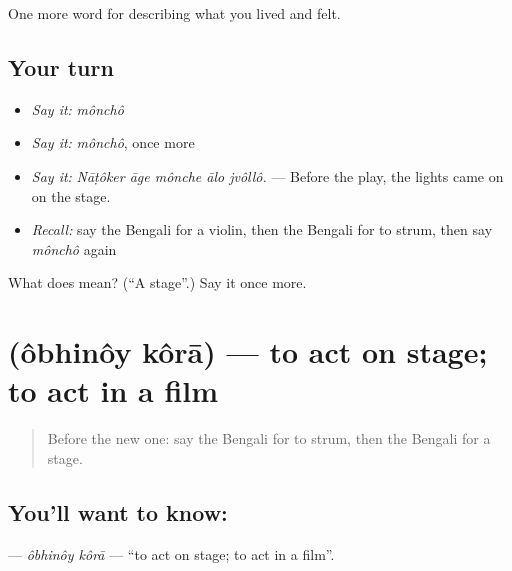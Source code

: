 \begin{grammarlens}[title={What you've built}]
One more word for describing what you lived and felt.
\end{grammarlens}

\subsection*{Your turn}
\begin{itemize}
\raggedright
  \item \emph{Say it:} \emph{mônchô}
  \item \emph{Say it:} \emph{mônchô}, once more
  \item \emph{Say it:} \emph{Nāṭôker āge mônche ālo jvôllô.} — Before the play, the lights came on on the stage.
  \item \emph{Recall:} say the Bengali for a violin, then the Bengali for to strum, then say \emph{mônchô} again
\end{itemize}

\begin{tcolorbox}[breakable,colback=teal!4,colframe=teal!35!black,title={Before you move on}]
What does  mean? (\textquotedblleft{}A stage\textquotedblright{}.) Say it once more.
\end{tcolorbox}
\section[\texorpdfstring{\bn{অভিনয়} \bn{করা} (ôbhinôy kôrā)}{অভিনয় করা (ôbhinôy kôrā)}]{  (ôbhinôy kôrā) — to act on stage; to act in a film}

\label{lesson:BN-C527-obhinoy-kora}



\begin{quote}
Before the new one: say the Bengali for to strum, then the Bengali for a stage.
\end{quote}

\subsection*{You'll want to know:  }
\textbf{ } — \emph{ôbhinôy kôrā} — \textquotedblleft{}to act on stage; to act in a film\textquotedblright{}.

\begin{quote}
     
\end{quote}

